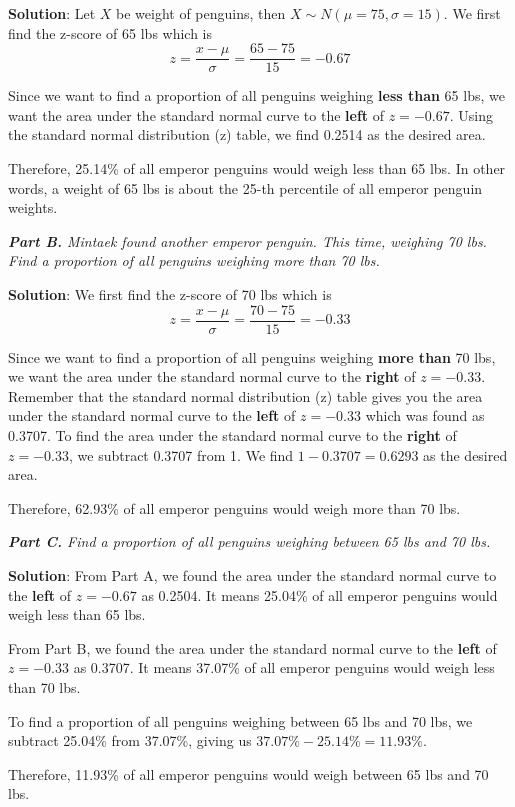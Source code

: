 \documentclass[12pt]{article}
\begin{document}
\textbf{Solution}: Let $X$ be weight of penguins, then $X \sim N(\mu = 75, \sigma = 15)$. We first find the z-score of 65 lbs which is
\[ z = \dfrac{x - \mu}{\sigma} = \dfrac{65 - 75}{15} = -0.67 \]

Since we want to find a proportion of all penguins weighing \textbf{less than} 65 lbs, we want the area under the standard normal curve to the \textbf{left} of $z = -0.67$. Using the standard normal distribution (z) table, we find 0.2514 as the desired area. 

Therefore, 25.14\% of all emperor penguins would weigh less than 65 lbs. In other words, a weight of 65 lbs is about the 25-th percentile of all emperor penguin weights.

\textit{\textbf{Part B.} Mintaek found another emperor penguin. This time, weighing 70 lbs. Find a proportion of all penguins weighing more than 70 lbs.}

\textbf{Solution}: We first find the z-score of 70 lbs which is
\[ z = \dfrac{x - \mu}{\sigma} = \dfrac{70 - 75}{15} = -0.33 \]

Since we want to find a proportion of all penguins weighing \textbf{more than} 70 lbs, we want the area under the standard normal curve to the \textbf{right} of $z = -0.33$. Remember that the standard normal distribution (z) table gives you the area under the standard normal curve to the \textbf{left} of $z = -0.33$ which was found as 0.3707. To find the area under the standard normal curve to the \textbf{right} of $z = -0.33$, we subtract 0.3707 from 1. We find $1 - 0.3707 = 0.6293$ as the desired area. 

Therefore, 62.93\% of all emperor penguins would weigh more than 70 lbs.

\textit{\textbf{Part C.} Find a proportion of all penguins weighing between 65 lbs and 70 lbs.}

\textbf{Solution}: From Part A, we found the area under the standard normal curve to the \textbf{left} of $z = -0.67$ as 0.2504. It means 25.04\% of all emperor penguins would weigh less than 65 lbs.

From Part B, we found the area under the standard normal curve to the \textbf{left} of $z = -0.33$ as 0.3707. It means 37.07\% of all emperor penguins would weigh less than 70 lbs.

To find a proportion of all penguins weighing between 65 lbs and 70 lbs, we subtract 25.04\% from 37.07\%, giving us $37.07\% - 25.14\% = 11.93\%$.

Therefore, 11.93\% of all emperor penguins would weigh between 65 lbs and 70 lbs.
\end{document}
